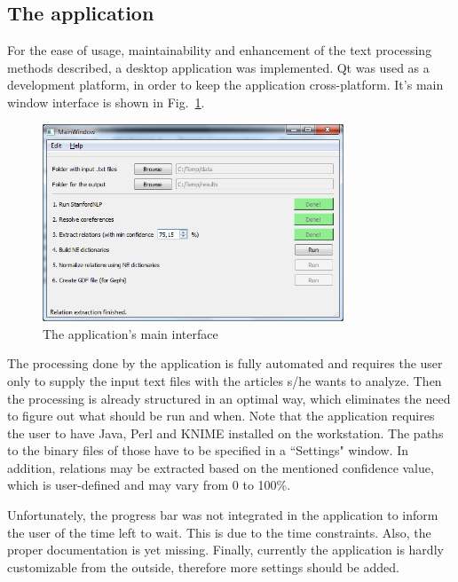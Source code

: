 \documentclass[]{article}
\begin{document}
\subsection{The application}
%
For the ease of usage, maintainability and enhancement of the text processing methods described, a desktop application was implemented. Qt was used as a development platform, in order to keep the application cross-platform. It's main window interface is shown in Fig.~\ref{Application}.
\begin{figure}[htbp]
  \centering
    \includegraphics[width=0.8\textwidth]{images/Application}
    \caption{The application's main interface}
  \label{Application}
\end{figure}

The processing done by the application is fully automated and requires the user only to supply the input text files with the articles s/he wants to analyze. Then the processing is already structured in an optimal way, which eliminates the need to figure out what should be run and when. Note that the application requires the user to have Java, Perl and KNIME installed on the workstation. The paths to the binary files of those have to be specified in a ``Settings" window. In addition, relations may be extracted based on the mentioned confidence value, which is user-defined and may vary from 0 to 100\%.

Unfortunately, the progress bar was not integrated in the application to inform the user of the time left to wait. This is due to the time constraints. Also, the proper documentation is yet missing. Finally, currently the application is hardly customizable from the outside, therefore more settings should be added.

%
\end{document}
